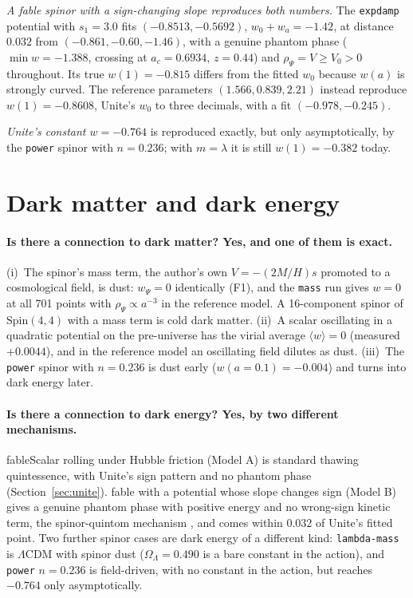 \documentclass[11pt,a4paper]{article}
\newcommand{\fableScalar}{\textsf{fableScalar}}
\newcommand{\fable}{\textsf{fable}}
\begin{document}
\emph{A \fable{} spinor with a sign-changing slope reproduces both numbers.} The \texttt{expdamp}
potential with $s_1=3.0$ fits $(-0.8513,-0.5692)$, $w_0+w_a=-1.42$, at distance $0.032$ from
$(-0.861,-0.60,-1.46)$, with a genuine phantom phase ($\min w=-1.388$, crossing at $a_c=0.6934$,
$z=0.44$) and $\rho_\Psi=V\ge V_0>0$ throughout. Its true $w(1)=-0.815$ differs from the fitted
$w_0$ because $w(a)$ is strongly curved. The reference parameters $(1.566,0.839,2.21)$ instead
reproduce $w(1)=-0.8608$, Unite's $w_0$ to three decimals, with a fit $(-0.978,-0.245)$.

\emph{Unite's constant $w=-0.764$} is reproduced exactly, but only asymptotically, by the
\texttt{power} spinor with $n=0.236$; with $m=\lambda$ it is still $w(1)=-0.382$ today.

\section{Dark matter and dark energy}\label{sec:dmde}

\paragraph{Is there a connection to dark matter? Yes, and one of them is exact.}
(i)~The spinor's mass term, the author's own $V=-(2M/H)s$ promoted to a cosmological field, is
dust: $w_\Psi=0$ identically (F1), and the \texttt{mass} run gives $w=0$ at all 701 points with
$\rho_\Psi\propto a^{-3}$ in the reference model. A 16-component spinor of $\mathrm{Spin}(4,4)$
with a mass term is cold dark matter. (ii)~A scalar oscillating in a quadratic potential on the
pre-universe has the virial average $\langle w\rangle=0$ (measured $+0.0044$), and in the
reference model an oscillating field dilutes as dust. (iii)~The \texttt{power} spinor with
$n=0.236$ is dust early ($w(a=0.1)=-0.004$) and turns into dark energy later.

\paragraph{Is there a connection to dark energy? Yes, by two different mechanisms.}
\fableScalar{} rolling under Hubble friction (Model A) is standard thawing quintessence, with
Unite's sign pattern and no phantom phase (Section~\ref{sec:unite}). \fable{} with a potential whose
slope changes sign (Model B) gives a genuine phantom phase with positive energy and no wrong-sign
kinetic term, the spinor-quintom mechanism \cite{Cai2008}, and comes within $0.032$ of Unite's
fitted point. Two further spinor cases are dark energy of a different kind: \texttt{lambda-mass}
is $\Lambda$CDM with spinor dust ($\Omega_\Lambda=0.490$ is a bare constant in the action), and
\texttt{power} $n=0.236$ is field-driven, with no constant in the action, but reaches $-0.764$
only asymptotically.
\end{document}
